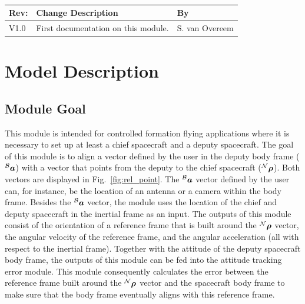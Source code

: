 \documentclass[]{AVSreport}
\begin{document}
\pagestyle{empty}


\makeCover
~

%
%
\newpage


\tableofcontents\vfill


%
%
{\renewcommand{\arraystretch}{2}\noindent
\begin{tabular}{|p{0.5in}|p{4.5in}|p{1.14in}|}
\hline
{\bfseries Rev}: & {\bfseries Change Description} & {\bfseries By} \\
\hline
V1.0 &First documentation on this module. & S. van Overeem \\
\hline
\end{tabular}
}



\newpage
\setcounter{page}{1}
\pagestyle{fancy}

\section{Model Description}

\subsection{Module Goal}\label{subsec:goal}

This module is intended for controlled formation flying applications where it is necessary to set up at least a chief spacecraft and a deputy spacecraft. The goal of this module is to align a vector defined by the user in the deputy body frame ($^{\cal B}{\bm a}$) with a vector that points from the deputy to the chief spacecraft ($^{\cal N}{\bm \rho}$). Both vectors are displayed in Fig.~\ref{fig:rel_point}. The $^{\cal B}{\bm a}$ vector defined by the user can, for instance, be the location of an antenna or a camera within the body frame. Besides the $^{\cal B}{\bm a}$ vector, the module uses the location of the chief and deputy spacecraft in the inertial frame as an input. The outputs of this module consist of the orientation of a reference frame that is built around the $^{\cal N}{\bm \rho}$ vector, the angular velocity of the reference frame, and the angular acceleration (all with respect to the inertial frame). Together with the attitude of the deputy spacecraft body frame, the outputs of this module can be fed into the attitude tracking error module. This module consequently calculates the error between the reference frame built around the $^{\cal N}{\bm \rho}$ vector and the spacecraft body frame to make sure that the body frame eventually aligns with this reference frame. 
\end{document}
